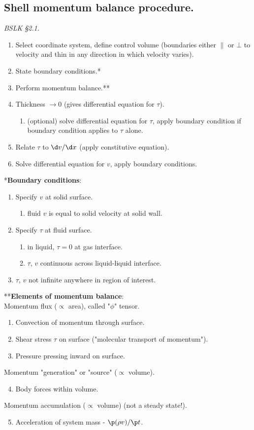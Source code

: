 \subsection{Shell momentum balance procedure.}
\textit{BSLK §2.1.}
\begin{enumerate}
	\item Select coordinate system, define control volume (boundaries either $\parallel$ or $\bot$ to velocity and thin in any direction in which velocity varies).
	\item State boundary conditions.*
	\item Perform momentum balance.**
	\item Thickness $\to0$ (gives differential equation for $\tau$).
	\begin{enumerate}
		\item (optional) solve differential equation for $\tau$, apply boundary condition if boundary condition applies to $\tau$ alone.
	\end{enumerate}
	\item Relate $\tau$ to $\d v/\d x$ (apply constitutive equation).
	\item Solve differential equation for $v$, apply boundary conditions.
\end{enumerate}
*\textbf{Boundary conditions}:
\begin{enumerate}
	\item Specify $v$ at solid surface.
	\begin{enumerate}
		\item fluid $v$ is equal to solid velocity at solid wall.
	\end{enumerate}
	\item Specify $\tau$ at fluid surface.
	\begin{enumerate}
		\item in liquid, $\tau=0$ at gas interface.
		\item $\tau$, $v$ continuous across liquid-liquid interface.
	\end{enumerate}
	\item $\tau$, $v$ not infinite anywhere in region of interest.
\end{enumerate}
**\textbf{Elements of momentum balance}:\\
Momentum flux ($\propto$ area), called "$\phi$" tensor.
\begin{enumerate}
	\item Convection of momentum through surface.
	\item Shear stress $\tau$ on surface ("molecular transport of momentum").
	\item Pressure pressing inward on surface.
\end{enumerate}
Momentum "generation" or "source" ($\propto$ volume).
\begin{enumerate}
	\setcounter{enumi}{3}
	\item Body forces within volume.
\end{enumerate}
Momentum accumulation ($\propto$ volume) (not a steady state!).
\begin{enumerate}
	\setcounter{enumi}{4}
	\item Acceleration of system mass - $\p(\rho v)/\p t$.
\end{enumerate}

